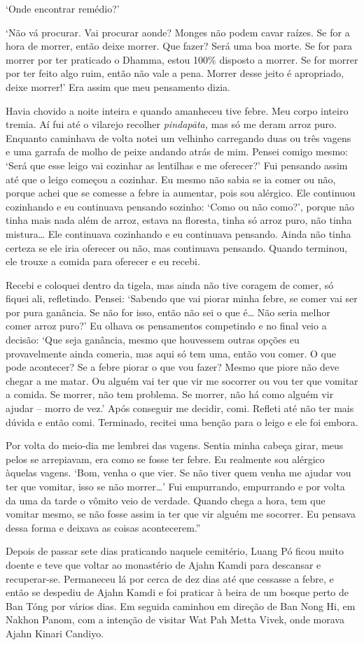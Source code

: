 `Onde encontrar remédio?'

`Não vá procurar. Vai procurar aonde? Monges não podem cavar raízes. Se
for a hora de morrer, então deixe morrer. Que fazer? Será uma boa morte.
Se for para morrer por ter praticado o Dhamma, estou 100\% disposto a
morrer. Se for morrer por ter feito algo ruim, então não vale a pena.
Morrer desse jeito é apropriado, deixe morrer!' Era assim que meu
pensamento dizia.

Havia chovido a noite inteira e quando amanheceu tive febre. Meu corpo
inteiro tremia. Aí fui até o vilarejo recolher \emph{pindapāta,} mas só
me deram arroz puro. Enquanto caminhava de volta notei um velhinho
carregando duas ou três vagens e uma garrafa de molho de peixe andando
atrás de mim. Pensei comigo mesmo: `Será que esse leigo vai cozinhar as
lentilhas e me oferecer?' Fui pensando assim até que o leigo começou a
cozinhar. Eu mesmo não sabia se ia comer ou não, porque achei que se
comesse a febre ia aumentar, pois sou alérgico. Ele continuou cozinhando
e eu continuava pensando sozinho: `Como ou não como?', porque não tinha
mais nada além de arroz, estava na floresta, tinha só arroz puro, não
tinha mistura\ldots{} Ele continuava cozinhando e eu continuava
pensando. Ainda não tinha certeza se ele iria oferecer ou não, mas
continuava pensando. Quando terminou, ele trouxe a comida para oferecer
e eu recebi.

Recebi e coloquei dentro da tigela, mas ainda não tive coragem de comer,
só fiquei ali, refletindo. Pensei: `Sabendo que vai piorar minha febre,
se comer vai ser por pura ganância. Se não for isso, então não sei o que
é\ldots{} Não seria melhor comer arroz puro?' Eu olhava os pensamentos
competindo e no final veio a decisão: `Que seja ganância, mesmo que
houvessem outras opções eu provavelmente ainda comeria, mas aqui só tem
uma, então vou comer. O que pode acontecer? Se a febre piorar o que vou
fazer? Mesmo que piore não deve chegar a me matar. Ou alguém vai ter que
vir me socorrer ou vou ter que vomitar a comida. Se morrer, não tem
problema. Se morrer, não há como alguém vir ajudar -- morro de vez.'
Após conseguir me decidir, comi. Refleti até não ter mais dúvida e então
comi. Terminado, recitei uma benção para o leigo e ele foi embora.

Por volta do meio-dia me lembrei das vagens. Sentia minha cabeça girar,
meus pelos se arrepiavam, era como se fosse ter febre. Eu realmente sou
alérgico àquelas vagens. `Bom, venha o que vier. Se não tiver quem venha
me ajudar vou ter que vomitar, isso se não morrer\ldots{}' Fui
empurrando, empurrando e por volta da uma da tarde o vômito veio de
verdade. Quando chega a hora, tem que vomitar mesmo, se não fosse assim
ia ter que vir alguém me socorrer. Eu pensava dessa forma e deixava as
coisas acontecerem.''

Depois de passar sete dias praticando naquele cemitério, Luang Pó
ficou muito doente e teve que voltar ao monastério de Ajahn Kamdi para
descansar e recuperar-se. Permaneceu lá por cerca de dez dias até que
cessasse a febre, e então se despediu de Ajahn Kamdi e foi praticar à
beira de um bosque perto de Ban Tóng por vários dias. Em seguida
caminhou em direção de Ban Nong Hi, em Nakhon Panom, com a intenção de
visitar Wat Pah Metta Vivek, onde morava Ajahn Kinari Candiyo.
